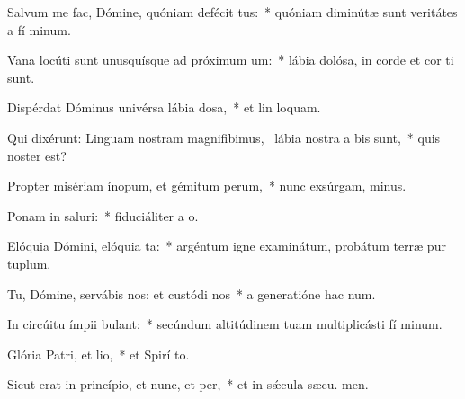 \item Salvum me fac, Dómine, quóniam defécit tus:~* quóniam diminútæ sunt veritátes a fí minum.
\item Vana locúti sunt unusquísque ad próximum um:~* lábia dolósa, in corde et cor ti sunt.
\item Dispérdat Dóminus univérsa lábia dosa,~* et lin loquam.
\item Qui dixérunt: Linguam nostram magnifibimus,~\pscross{} lábia nostra a bis sunt,~* quis noster  est?
\item Propter misériam ínopum, et gémitum perum,~* nunc exsúrgam,  minus.
\item Ponam in saluri:~* fiduciáliter a  o.
\item Elóquia Dómini, elóquia ta:~* argéntum igne examinátum, probátum terræ pur tuplum.
\item Tu, Dómine, servábis nos: et custódi nos~* a generatióne hac  num.
\item In circúitu ímpii bulant:~* secúndum altitúdinem tuam multiplicásti fí minum.
\item Glória Patri, et lio,~* et Spirí to.
\item Sicut erat in princípio, et nunc, et per,~* et in sǽcula sæcu. men.
